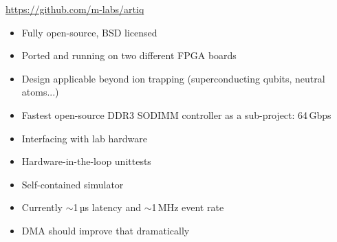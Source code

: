 \documentclass[final,presentation,compress]{beamer}
\begin{document}
\begin{frame}
  \begin{center}
  \url{https://github.com/m-labs/artiq}
  \end{center}

  \footnotesize
  \begin{itemize}
    \item Fully open-source, BSD licensed
    \item Ported and running on two different FPGA boards
    \item Design applicable beyond ion trapping (superconducting qubits,
      neutral atoms...)
    \item Fastest open-source DDR3 SODIMM controller as a sub-project: 64\,Gbps
    \item Interfacing with lab hardware
    \item Hardware-in-the-loop unittests
    \item Self-contained simulator
    \item Currently $\sim$1\,µs latency and $\sim$1\,MHz event rate
    \item DMA should improve that dramatically
  \end{itemize}

\end{frame}
\end{document}
